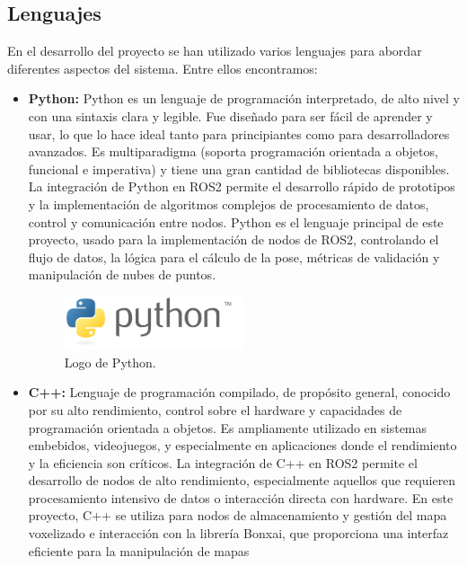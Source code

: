 \documentclass[12pt, a4paper, twoside]{article}
\begin{document}
\subsection{Lenguajes}
En el desarrollo del proyecto se han utilizado varios lenguajes para abordar diferentes aspectos del sistema.
Entre ellos encontramos:

\begin{itemize}
  \item\textbf{Python:\cite{python}} Python es un lenguaje de programación interpretado, de alto nivel y con una sintaxis clara y legible. 
  Fue diseñado para ser fácil de aprender y usar, lo que lo hace ideal tanto para principiantes como para desarrolladores 
  avanzados. Es multiparadigma (soporta programación orientada a objetos, funcional e imperativa) y tiene una gran cantidad 
  de bibliotecas disponibles. La integración de Python en ROS2\cite{doi:10.1126/scirobotics.abm6074} permite el desarrollo rápido de prototipos y la implementación
  de algoritmos complejos de procesamiento de datos, control y comunicación entre nodos. Python es el lenguaje principal
  de este proyecto, usado para la implementación de nodos de ROS2, controlando el flujo de datos, la lógica para el cálculo 
  de la pose, métricas de validación y manipulación de nubes de puntos.
  \begin{figure}[h]
    \centering
      \includegraphics[width=0.5\textwidth]{Python_logo.png} 
    \caption{Logo de Python.}
  \end{figure} 
  \item \textbf{C++:\cite{cpp}} Lenguaje de programación compilado, de propósito general, conocido por su alto rendimiento, 
  control sobre el hardware y capacidades de programación orientada a objetos. Es ampliamente utilizado en sistemas embebidos, 
  videojuegos, y especialmente en aplicaciones donde el rendimiento y la eficiencia son críticos. La integración de C++
  en ROS2\cite{doi:10.1126/scirobotics.abm6074} permite el desarrollo de nodos de alto rendimiento, especialmente aquellos que requieren procesamiento intensivo
  de datos o interacción directa con hardware. En este proyecto, C++ se utiliza para nodos de almacenamiento y gestión del
  mapa voxelizado e interacción con la librería Bonxai, que proporciona una interfaz eficiente para la manipulación de mapas

\end{itemize}
\end{document}
